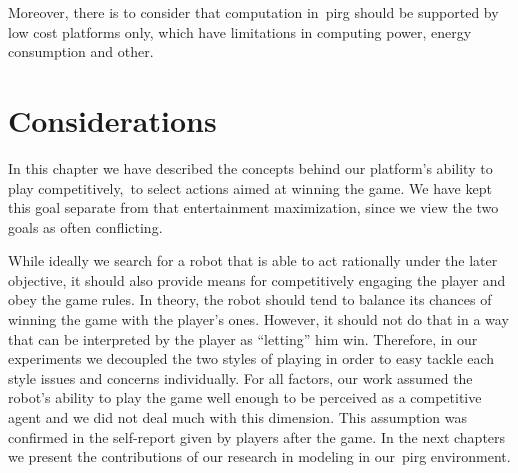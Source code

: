 Moreover, there is to consider that computation in~\gls{pirg} should be supported by low cost platforms only, which have limitations in computing power, energy consumption and other.

\section{Considerations}
In this chapter we have described the concepts behind our platform's ability to play competitively,~\ie to select actions aimed at winning the game. We have kept this goal separate from that entertainment maximization, since we view the two goals as often conflicting.

While ideally we search for a robot that is able to act rationally under the later objective, it should also provide means for competitively engaging the player and obey the game rules. In theory, the robot should tend to balance its chances of winning the game with the player's ones. However, it should not do that in a way that can be interpreted by the player as ``letting'' him win. Therefore, in our experiments we decoupled the two styles of playing in order to easy tackle each style issues and concerns individually. For all factors, our work assumed the robot's ability to play the game well enough to be perceived as a competitive agent and we did not deal much with this dimension. This assumption was confirmed in the self-report given by players after the game. In the next chapters we present the contributions of our research in modeling in our~\gls{pirg} environment.